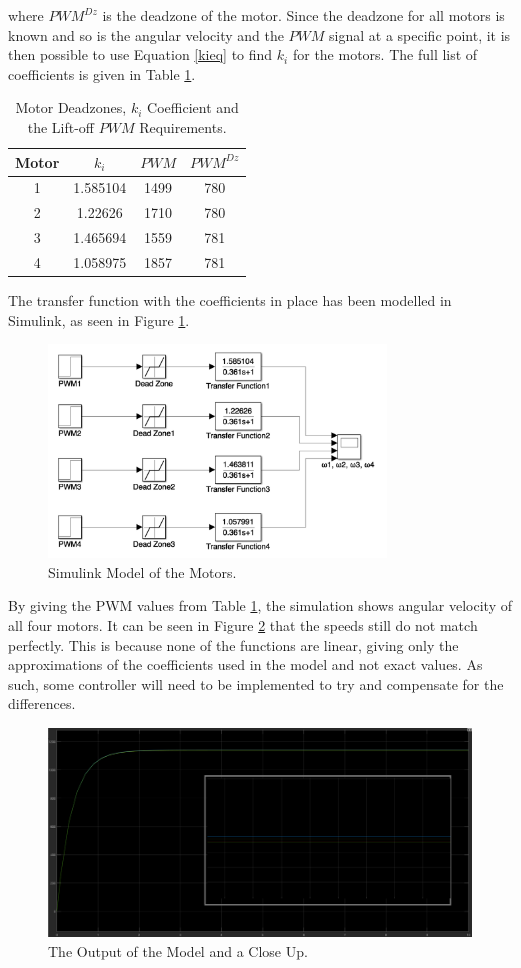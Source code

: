 where $PWM^{Dz}$ is the deadzone of the motor.
Since the deadzone for all motors is known and so is the angular velocity and the $PWM$ signal at a specific point, it is then possible to use Equation \ref{kieq} to find $k_i$ for the motors. The full list of coefficients is given in Table \ref{motorCoeffs}.

\begin{table}[H]
\centering
\begin{tabular}{|c|c|c|c|}
\hline
Motor	& $k_i$ 	& $PWM$ 	& $PWM^{Dz}$ 	\\ \hline
1 		& 1.585104	& 1499		& 780			\\ \hline
2 		& 1.22626	& 1710		& 780			\\ \hline
3 		& 1.465694	& 1559		& 781			\\ \hline
4 		& 1.058975	& 1857		& 781			\\ \hline

\end{tabular}
\caption{Motor Deadzones, $k_i$ Coefficient and the Lift-off $PWM$ Requirements.}
\label{motorCoeffs}
\end{table}

The transfer function with the coefficients in place has been modelled in Simulink, as seen in Figure \ref{motorSimulink}.
\begin{figure}[H]
  \centering
    \includegraphics[width=0.8\textwidth]{images/simulinkmotor.png}
	\caption{Simulink Model of the Motors.}
	\label{motorSimulink}
\end{figure}

By giving the PWM values from Table \ref{motorCoeffs}, the simulation shows angular velocity of all four motors. It can be seen in Figure \ref{motorScope} that the speeds still do not match perfectly. This is because none of the functions are linear, giving only the approximations of the coefficients used in the model and not exact values. As such, some controller will need to be implemented to try and compensate for the differences.

\begin{figure}[H]
  \centering
    \includegraphics[width=1\textwidth]{images/scopewithcloseup.png}
	\caption{The Output of the Model and a Close Up.}
	\label{motorScope}
\end{figure}